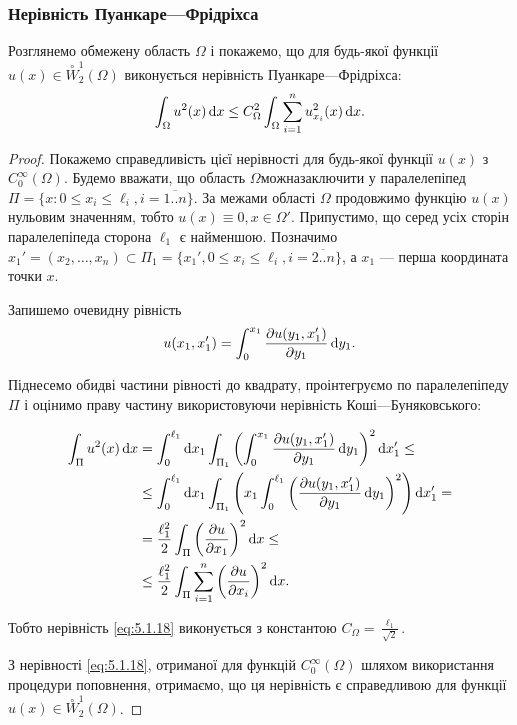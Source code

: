 \subsubsection{Нерівність Пуанкаре---Фрідріхса}

\begin{proposition}
    Розглянемо обмежену область $\Omega$ і покажемо, що для будь-якої функції $u(x) \in \overset{\circ}{W}_2^1(\Omega)$ виконується нерівність Пуанкаре---Фрідріхса:
    \begin{equation}
        \label{eq:5.1.18}
        \int_\Omega u^2(x) \mathop{}\!\mathrm{d} x \le C_\Omega^2 \int_\Omega \sum_{i = 1}^n u_{x_i}^2(x) \mathop{}\!\mathrm{d} x.
    \end{equation}
\end{proposition}

\begin{proof}
    Покажемо справедливість цієї нерівності для будь-якої функції $u(x)$ з $C_0^\infty(\Omega)$. Будемо вважати, що область $\Omega можна заключити$ у паралелепіпед $\Pi = \{x: 0 \le x_i \le \ell_i, i = \overline{1..n}\}$. За межами області $\Omega$ продовжимо функцію $u(x)$ нульовим значенням, тобто $u(x) \equiv 0, x \in \Omega'$. Припустимо, що серед усіх сторін паралелепіпеда сторона $\ell_1$ є найменшою. Позначимо $x_1' = (x_2, \ldots, x_n) \subset \Pi_1 = \{x_1', 0 \le x_i \le \ell_i, i = \overline{2..n}\}$, а $x_1$ --- перша координата точки $x$. \medskip

    Запишемо очевидну рівність
    \begin{equation*}
        u(x_1, x_1') = \int_0^{x_1} \frac{\partial u(y_1, x_1')}{\partial y_1} \mathop{}\!\mathrm{d} y_1.
    \end{equation*}

    Піднесемо обидві частини рівності до квадрату, проінтегруємо по паралелепіпеду $\Pi$ і оцінимо праву частину використовуючи нерівність Коші---Буняковського:

    \begin{align*}
        \int_\Pi u^2(x) \diff x
        &= \int_0^{\ell_1} \diff x_1 \int_{\Pi_1} \left( \int_0^{x_1} \frac{\partial u(y_1, x_1')}{\partial y_1} \diff y_1 \right)^2 \diff x_1' \le \\
        &\le \int_0^{\ell_1} \diff x_1 \int_{\Pi_1} \left(  x_1 \int_0^{\ell_1} \left( \frac{\partial u(y_1, x_1')}{\partial y_1} \diff y_1 \right)^2 \right) \diff x_1' = \\
        &= \frac{\ell_1^2}{2} \int_\Pi \left( \frac{\partial u}{\partial x_1} \right)^2 \diff x \le \\
        &\le \frac{\ell_1^2}{2} \int_{\Pi} \sum_{i = 1}^n \left( \frac{\partial u}{\partial x_i} \right)^2 \diff x.
    \end{align*}

    Тобто нерівність \eqref{eq:5.1.18} виконується з константою $C_\Omega = \frac{\ell_1}{\sqrt{2}}$. \medskip

    З нерівності \eqref{eq:5.1.18}, отриманої для функцій $C_0^\infty(\Omega)$ шляхом використання процедури поповнення, отримаємо, що ця нерівність є справедливою для функції $u(x) \in \overset{\circ}{W}_2^1(\Omega)$.
\end{proof}

